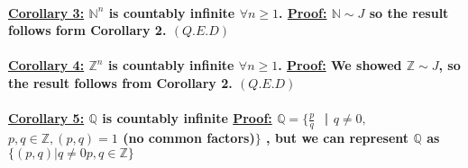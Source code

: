 \documentclass[10pt,a4paper]{article}
\begin{document}
\paragraph{\underline{Corollary 3:} $\mathbb{N}^{n}$ is countably infinite $\forall n \geq 1$.
\newline 
\underline{Proof:} $\mathbb{N} \sim J$ so the result follows form Corollary 2. $(Q.E.D)$}

\paragraph{\underline{Corollary 4:} $\mathbb{Z}^{n}$ is countably infinite $\forall n \geq 1$.
\newline
\underline{Proof:} We showed $\mathbb{Z} \sim J$, so the result follows from Corollary 2. $(Q.E.D)$}

\paragraph{\underline{Corollary 5:} $\mathbb{Q}$ is countably infinite
\newline
\underline{Proof:} $\mathbb{Q} = \lbrace \frac{p}{q} $ $ $ | $  q \neq 0,$ $ p,q \in \mathbb{Z}, (p,q) = 1$ (no common factors)$ \rbrace$ , but we can represent $\mathbb{Q}$ as $\lbrace (p,q) | q \neq 0 p,q \in \mathbb{Z} \rbrace$}
\end{document}
